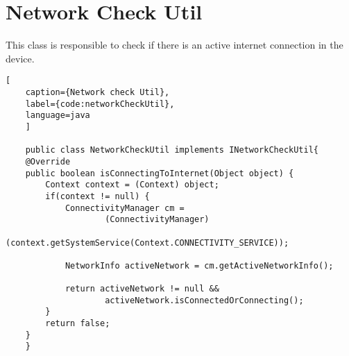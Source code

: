 \newpage
\section{Network Check Util}
This class is responsible to check if there is an active internet 
connection in the device.
\begin{lstlisting}[
    caption={Network check Util},
    label={code:networkCheckUtil},
    language=java
    ]

    public class NetworkCheckUtil implements INetworkCheckUtil{
    @Override
    public boolean isConnectingToInternet(Object object) {
        Context context = (Context) object;
        if(context != null) {
            ConnectivityManager cm =
                    (ConnectivityManager) 
                    (context.getSystemService(Context.CONNECTIVITY_SERVICE));

            NetworkInfo activeNetwork = cm.getActiveNetworkInfo();

            return activeNetwork != null &&
                    activeNetwork.isConnectedOrConnecting();
        }
        return false;
    }
    }
\end{lstlisting}    

